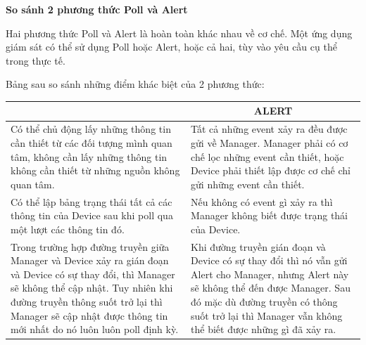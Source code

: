 \documentclass[12pt,oneside,a4paper,reqno]{report}
\begin{document}
\begin{large}
\textbf{So sánh 2 phương thức Poll và Alert}

Hai phương thức Poll và Alert là hoàn toàn khác nhau về cơ chế. Một ứng dụng giám sát có thể sử dụng Poll hoặc Alert, hoặc cả hai, tùy vào yêu cầu cụ thể trong thực tế.

Bảng sau so sánh những điểm khác biệt của 2 phương thức:

\begin{longtable}{|p{8cm}|p{8cm}|}
\hline
\rowcolor[HTML]{EFEFEF} 
\multicolumn{1}{|c|}{\cellcolor[HTML]{EFEFEF}\textbf{POLL}}                                                                                                                                                                                                    & \multicolumn{1}{c|}{\cellcolor[HTML]{EFEFEF}\textbf{ALERT}}                                                                                                                                                                                   \\ \hline
Có thể chủ động lấy những thông tin cần thiết từ các đối tượng mình quan tâm, không cần lấy những thông tin không cần thiết từ những nguồn không quan tâm.                                                                                                     & Tất cả những event xảy ra đều được gửi về Manager. Manager phải có cơ chế lọc những event cần thiết, hoặc Device phải thiết lập được cơ chế chỉ gửi những event cần thiết.                                                                    \\ \hline
Có thể lập bảng trạng thái tất cả các thông tin của Device sau khi poll qua một lượt các thông tin đó.                                                                                                                                                         & Nếu không có event gì xảy ra thì Manager không biết được trạng thái của Device.                                                                                                                                                               \\ \hline
Trong trường hợp đường truyền giữa Manager và Device xảy ra gián đoạn và Device có sự thay đổi, thì Manager sẽ không thể cập nhật. Tuy nhiên khi đường truyền thông suốt trở lại thì Manager sẽ cập nhật được thông tin mới nhất do nó luôn luôn poll định kỳ. & Khi đường truyền gián đoạn và Device có sự thay đổi thì nó vẫn gửi Alert cho Manager, nhưng Alert này sẽ không thể đến được Manager. Sau đó mặc dù đường truyền có thông suốt trở lại thì Manager vẫn không thể biết được những gì đã xảy ra. \\ \hline

\end{longtable}
\end{large}
\end{document}

